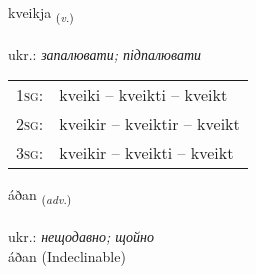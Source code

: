 \documentclass[frontgrid, backgrid]{flacards}\usepackage[]{graphicx}\usepackage[]{xcolor}
\begin{document}
\renewcommand{\flhead}{\vskip5pt \fboxsep=0pt {\small\bfseries\footnotesize Sagnorð | дієслово}}
\renewcommand{\fcfoot}{\vskip5pt \fboxsep=0pt \hspace{2pt}{\small\bfseries\footnotesize 2K}}

\renewcommand{\blhead}{\vskip5pt {\small\bfseries\footnotesize Sagnorð | дієслово }}
\renewcommand{\bcfoot}{\vskip5pt \hspace{2pt}{\small\bfseries\footnotesize 2K}}


{kveikja \small{\textsubscript{(\textit{v.})}} \\[1ex] %
\textphonetic{[kʰveiːca]} \\
ukr.: \emph{запалювати; підпалювати} \\  [2ex]
\renewcommand*{\arraystretch}{0.8}
\begin{tabular}{p{1cm}l}
\textsc{1sg}: & kveiki -- kveikti -- kveikt \\ 
\textsc{2sg}: & kveikir -- kveiktir -- kveikt \\ 
\textsc{3sg}: & kveikir -- kveikti -- kveikt \\ 
\end{tabular}
}


\renewcommand{\flhead}{\vskip5pt \fboxsep=0pt {\small\bfseries\footnotesize Atviksorð | прислівник}}
\renewcommand{\fcfoot}{\vskip5pt \fboxsep=0pt \hspace{2pt}{\small\bfseries\footnotesize 2K}}

\renewcommand{\blhead}{\vskip5pt {\small\bfseries\footnotesize Atviksorð | прислівник }}
\renewcommand{\bcfoot}{\vskip5pt \hspace{2pt}{\small\bfseries\footnotesize 2K}}


{áðan \small{\textsubscript{(\textit{adv.})}} \\[1ex]
\textphonetic{[auːðan]} \\
ukr.: \emph{нещодавно; щойно} \\  [2ex]
áðan (Indeclinable)}
\end{document}
